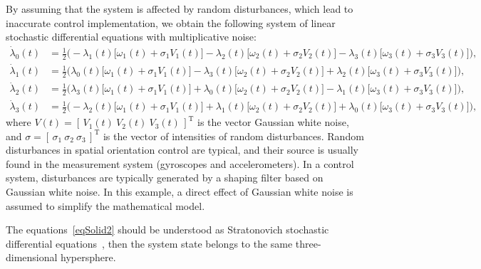 \documentclass[10pt,reqno]{amsart}
\newcommand{\trans}{{\scriptscriptstyle \mathrm{T}}}
\theoremstyle{plain}
\theoremstyle{remark}
\begin{document}
By assuming that the system is affected by random disturbances, which lead to inaccurate control implementation, we obtain the following system of linear stochastic differential equations with multiplicative noise:
\begin{equation}\label{eqSolid2}
  \begin{aligned}
    \dot\lambda_0(t) & = \tfrac{1}{2} \bigl( -\lambda_1(t) \bigl[ \omega_1(t) + \sigma_1 V_1(t) \bigr] - \lambda_2(t) \bigl[ \omega_2(t) + \sigma_2 V_2(t) \bigr] - \lambda_3(t) \bigl[ \omega_3(t) + \sigma_3 V_3(t) \bigr] \bigr), \\
    \dot\lambda_1(t) & = \tfrac{1}{2} \bigl( \lambda_0(t) \bigl[ \omega_1(t) + \sigma_1 V_1(t) \bigr] - \lambda_3(t) \bigl[ \omega_2(t) + \sigma_2 V_2(t) \bigr] + \lambda_2(t) \bigl[ \omega_3(t) + \sigma_3 V_3(t) \bigr] \bigr), \\
    \dot\lambda_2(t) & = \tfrac{1}{2} \bigl( \lambda_3(t) \bigl[ \omega_1(t) + \sigma_1 V_1(t) \bigr] + \lambda_0(t) \bigl[ \omega_2(t) + \sigma_2 V_2(t) \bigr] - \lambda_1(t) \bigl[ \omega_3(t) + \sigma_3 V_3(t) \bigr] \bigr), \\
    \dot\lambda_3(t) & = \tfrac{1}{2} \bigl( -\lambda_2(t) \bigl[ \omega_1(t) + \sigma_1 V_1(t) \bigr] + \lambda_1(t) \bigl[ \omega_2(t) + \sigma_2 V_2(t) \bigr] + \lambda_0(t) \bigl[ \omega_3(t) + \sigma_3 V_3(t) \bigr] \bigr),
  \end{aligned}
\end{equation}
where $V(t) = [ \, V_1(t) ~ V_2(t) ~ V_3(t) \, ]^\trans$ is the vector Gaussian white noise, and $\sigma = [ \, \sigma_1 ~ \sigma_2 ~ \sigma_3 \, ]^\trans$ is the vector of intensities of random disturbances. Random disturbances in spatial orientation control are typical, and their source is usually found in the measurement system (gyroscopes and accelerometers). In a control system, disturbances are typically generated by a shaping filter based on Gaussian white noise. In this example, a direct effect of Gaussian white noise is assumed to simplify the mathematical model.

The equations~\eqref{eqSolid2} should be understood as Stratonovich stochastic differential equations~\cite{Oks_13}, then the system state belongs to the same three-dimensional hypersphere.
\end{document}
